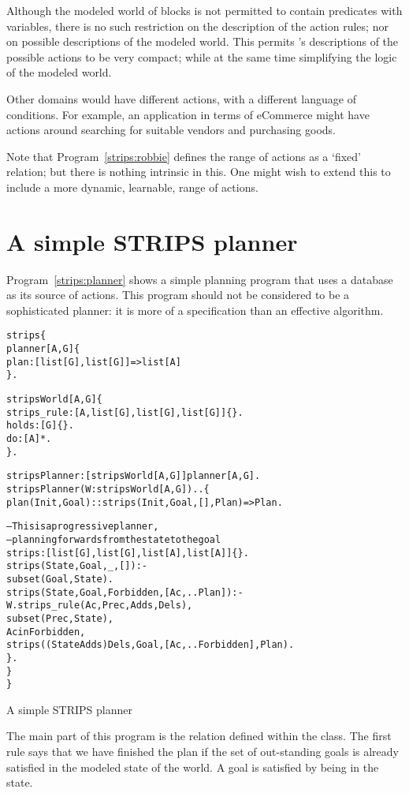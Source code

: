 Although the modeled world of blocks is not permitted to contain predicates with variables, there is no such restriction on the description of the action rules; nor on possible descriptions of the modeled world. This permits \go's descriptions of the possible actions to be very compact; while at the same time simplifying the logic of the modeled world.

Other domains would have different actions, with a different language of conditions. For example, an application in terms of eCommerce might have actions around searching for suitable vendors and purchasing goods.

Note that Program~\vref{strips:robbie} defines the range of actions as a `fixed' relation; but there is nothing intrinsic in this. One might wish to extend this to include a more dynamic, learnable, range of actions.

\section{A simple STRIPS planner}
\label{strips:strips}

Program~\vref{strips:planner} shows a simple planning program that uses a  database as its source of actions. This program should not be considered to be a sophisticated planner: it is more of a specification than an effective algorithm.
\begin{program}
\vspace{0.5ex}
\begin{alltt}
strips\{
  planner[A,G] \impl \{
    plan:[list[G],list[G]]=>list[A]
  \}.

  stripsWorld[A,G] \impl \{
    strips_rule:[A,list[G],list[G],list[G]]\{\}.
    holds:[G]\{\}.
    do:[A]*.
  \}.

  stripsPlanner:[stripsWorld[A,G]]\conarrow{}planner[A,G].
  stripsPlanner(W:stripsWorld[A,G])..\{
    plan(Init,Goal)::strips(Init,Goal,[],Plan) => Plan.

    -- This is a progressive planner,
    -- planning forwards from the state to the goal
    strips:[list[G],list[G],list[A],list[A]]\{\}.
    strips(State,Goal,_,[]):-
      subset(Goal,State).
    strips(State,Goal,Forbidden,[Ac,..Plan]) :-
      W.strips_rule(Ac,Prec,Adds,Dels),
      subset(Prec,State),
      \nasf{} Ac in Forbidden,
      strips((State\union{}Adds)\difference{}Dels,Goal,[Ac,..Forbidden],Plan).
   \}.
  \}
\}
\end{alltt}
\vspace{-2ex}
\caption{A simple STRIPS planner}
\label{strips:planner}
\end{program}
The main part of this program is the  relation defined within the  class. The first  rule says that we have finished the plan if the set of out-standing goals is already satisfied in the modeled state of the world. A goal is satisfied  by being in the state.

